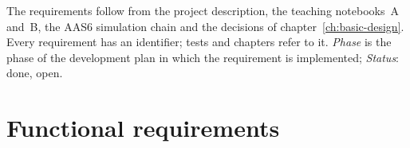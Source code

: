 
The requirements follow from the project description, the teaching
notebooks~A and~B, the AAS6 simulation chain and the decisions of
chapter~\ref{ch:basic-design}. Every requirement has an identifier;
tests and chapters refer to it. \emph{Phase} is the phase of the
development plan in which the requirement is implemented; \emph{Status}:
done, open.

\section{Functional requirements}

